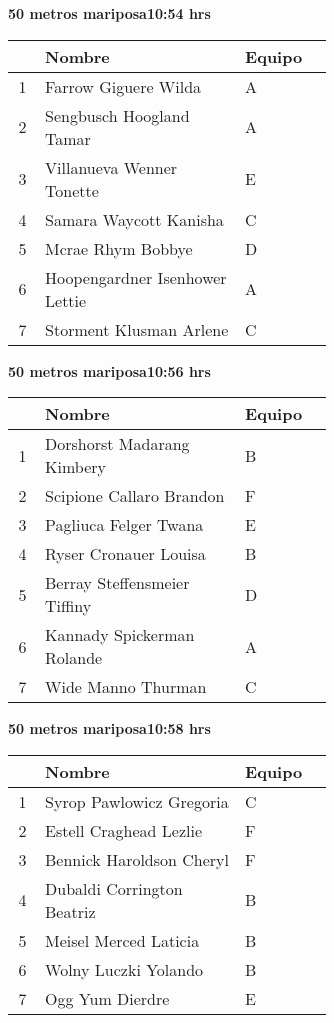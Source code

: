 \begin{minipage}{0.95\linewidth}
\begin{center}
\textbf{
50 metros mariposa\hspace{1cm}10:54 hrs}
\end{center}
\begin{tabular}{cp{0.63\linewidth}l}
\hline
& \textbf{Nombre} & \textbf{Equipo} \\ \hline
1 & Farrow Giguere Wilda & A \\ 
2 & Sengbusch Hoogland Tamar & A \\ 
3 & Villanueva Wenner Tonette & E \\ 
4 & Samara Waycott Kanisha & C \\ 
5 & Mcrae Rhym Bobbye & D \\ 
6 & Hoopengardner Isenhower Lettie & A \\ 
7 & Storment Klusman Arlene & C \\ 
\end{tabular}
\end{minipage}
\begin{minipage}{0.95\linewidth}
\begin{center}
\textbf{
50 metros mariposa\hspace{1cm}10:56 hrs}
\end{center}
\begin{tabular}{cp{0.63\linewidth}l}
\hline
& \textbf{Nombre} & \textbf{Equipo} \\ \hline
1 & Dorshorst Madarang Kimbery & B \\ 
2 & Scipione Callaro Brandon & F \\ 
3 & Pagliuca Felger Twana & E \\ 
4 & Ryser Cronauer Louisa & B \\ 
5 & Berray Steffensmeier Tiffiny & D \\ 
6 & Kannady Spickerman Rolande & A \\ 
7 & Wide Manno Thurman & C \\ 
\end{tabular}
\end{minipage}
\begin{minipage}{0.95\linewidth}
\begin{center}
\textbf{
50 metros mariposa\hspace{1cm}10:58 hrs}
\end{center}
\begin{tabular}{cp{0.63\linewidth}l}
\hline
& \textbf{Nombre} & \textbf{Equipo} \\ \hline
1 & Syrop Pawlowicz Gregoria & C \\ 
2 & Estell Craghead Lezlie & F \\ 
3 & Bennick Haroldson Cheryl & F \\ 
4 & Dubaldi Corrington Beatriz & B \\ 
5 & Meisel Merced Laticia & B \\ 
6 & Wolny Luczki Yolando & B \\ 
7 & Ogg Yum Dierdre & E \\ 
\end{tabular}
\end{minipage}
